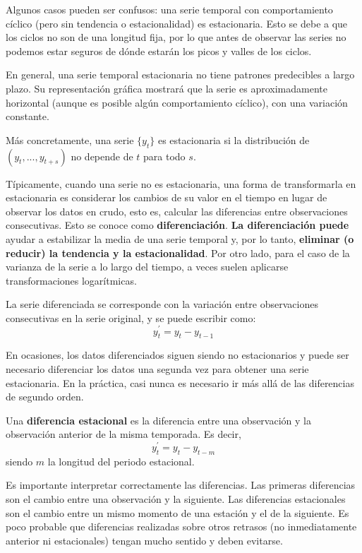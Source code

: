 \documentclass[]{book}
\begin{document}
Algunos casos pueden ser confusos: una serie temporal con comportamiento
cíclico (pero sin tendencia o estacionalidad) es estacionaria. Esto se
debe a que los ciclos no son de una longitud fija, por lo que antes de
observar las series no podemos estar seguros de dónde estarán los picos
y valles de los ciclos.

En general, una serie temporal estacionaria no tiene patrones
predecibles a largo plazo. Su representación gráfica mostrará que la
serie es aproximadamente horizontal (aunque es posible algún
comportamiento cíclico), con una variación constante.

Más concretamente, una serie \(\{y_t\}\) es estacionaria si la
distribución de \((y_t, ..., y_{t+s})\) no depende de \(t\) para todo
\(s\).

Típicamente, cuando una serie no es estacionaria, una forma de
transformarla en estacionaria es considerar los cambios de su valor en
el tiempo en lugar de observar los datos en crudo, esto es, calcular las
diferencias entre observaciones consecutivas. Esto se conoce como
\textbf{diferenciación}. \textbf{La diferenciación puede} ayudar a
estabilizar la media de una serie temporal y, por lo tanto,
\textbf{eliminar (o reducir) la tendencia y la estacionalidad}. Por otro
lado, para el caso de la varianza de la serie a lo largo del tiempo, a
veces suelen aplicarse transformaciones logarítmicas.

La serie diferenciada se corresponde con la variación entre
observaciones consecutivas en la serie original, y se puede escribir
como: \[y^{\prime}_t=y_t-y_{t-1}\]

En ocasiones, los datos diferenciados siguen siendo no estacionarios y
puede ser necesario diferenciar los datos una segunda vez para obtener
una serie estacionaria. En la práctica, casi nunca es necesario ir más
allá de las diferencias de segundo orden.

Una \textbf{diferencia estacional} es la diferencia entre una
observación y la observación anterior de la misma temporada. Es decir,
\[ y^{\prime}_t=y_t-y_{t-m}\] siendo \(m\) la longitud del periodo
estacional.

Es importante interpretar correctamente las diferencias. Las primeras
diferencias son el cambio entre una observación y la siguiente. Las
diferencias estacionales son el cambio entre un mismo momento de una
estación y el de la siguiente. Es poco probable que diferencias
realizadas sobre otros retrasos (no inmediatamente anterior ni
estacionales) tengan mucho sentido y deben evitarse.
\end{document}
